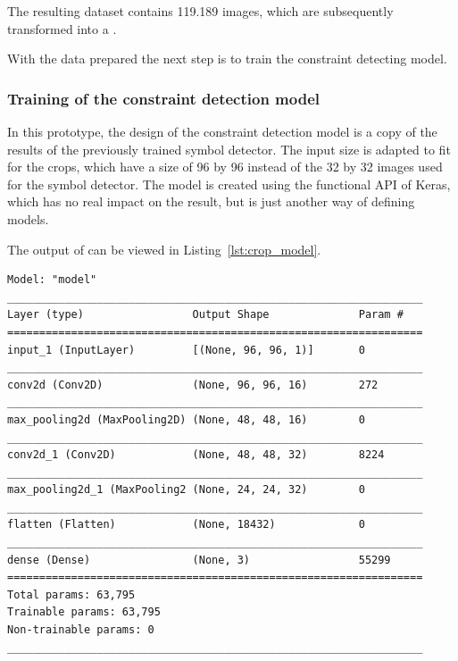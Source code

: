 The resulting dataset contains 119.189 images, which are subsequently transformed into a .


With the data prepared the next step is to train the constraint detecting model.

\subsubsection{Training of the constraint detection model}

In this prototype, the design of the constraint detection model is a copy of the results of the previously trained symbol detector.
The input size is adapted to fit for the crops, which have a size of 96 by 96 instead of the 32 by 32 images used for the symbol detector.
The model is created using the functional API of Keras, which has no real impact on the result, but is just another way of defining models.

The output of  can be viewed in Listing~\ref{lst:crop_model}.
\begin{lstlisting}[label={lst:crop_model}, caption={Summary of Constraint Detector.}]
Model: "model"
_________________________________________________________________
Layer (type)                 Output Shape              Param #   
=================================================================
input_1 (InputLayer)         [(None, 96, 96, 1)]       0         
_________________________________________________________________
conv2d (Conv2D)              (None, 96, 96, 16)        272       
_________________________________________________________________
max_pooling2d (MaxPooling2D) (None, 48, 48, 16)        0         
_________________________________________________________________
conv2d_1 (Conv2D)            (None, 48, 48, 32)        8224      
_________________________________________________________________
max_pooling2d_1 (MaxPooling2 (None, 24, 24, 32)        0         
_________________________________________________________________
flatten (Flatten)            (None, 18432)             0         
_________________________________________________________________
dense (Dense)                (None, 3)                 55299     
=================================================================
Total params: 63,795
Trainable params: 63,795
Non-trainable params: 0
_________________________________________________________________    
\end{lstlisting}

